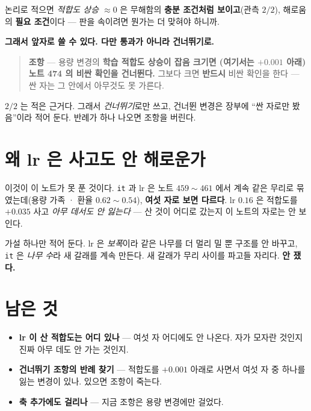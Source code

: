 \documentclass[11pt]{article}
\begin{document}
논리로 적으면 \emph{적합도 상승 $\approx 0$} 은 무해함의 \textbf{충분
조건처럼 보이고}(관측 $2/2$), 해로움의 \textbf{필요 조건}이다 --- 판을
속이려면 뭔가는 더 맞혀야 하니까.

\textbf{그래서 앞자로 쓸 수 있다. 다만 통과가 아니라 건너뛰기로.}

\begin{quote}
\textbf{조항} --- 용량 변경의 \textbf{학습 적합도 상승이 잡음 크기면
(여기서는 $+0.001$ 아래) 노트 474 의 비싼 확인을 건너뛴다.} 그보다 크면
\textbf{반드시} 비싼 확인을 한다 --- 싼 자는 그 안에서 아무것도 못
가른다.
\end{quote}

$2/2$ 는 적은 근거다. 그래서 \emph{건너뛰기}로만 쓰고, 건너뛴 변경은
장부에 ``싼 자로만 봤음''이라 적어 둔다. 반례가 하나 나오면 조항을
버린다.

\section{왜 lr 은 사고도 안 해로운가}

이것이 이 노트가 못 푼 것이다. \texttt{it} 과 lr 은 노트 $459 \sim 461$
에서 계속 같은 무리로 묶였는데(용량 가족 · 환율 $0.62 \sim 0.54$),
\textbf{여섯 자로 보면 다르다}. lr $0.16$ 은 적합도를 $+0.035$ 사고
\emph{아무 데서도 안 잃는다} --- 산 것이 어디로 갔는지 이 노트의 자로는
안 보인다.

가설 하나만 적어 둔다. lr 은 \emph{보폭}이라 같은 나무를 더 멀리 밀 뿐
구조를 안 바꾸고, \texttt{it} 은 \emph{나무 수}라 새 갈래를 계속 만든다.
새 갈래가 무리 사이를 파고들 자리다. \textbf{안 쟀다.}

\section*{남은 것}

\begin{itemize}
\item \textbf{lr 이 산 적합도는 어디 있나} --- 여섯 자 어디에도 안 나온다.
자가 모자란 것인지 진짜 아무 데도 안 가는 것인지.
\item \textbf{건너뛰기 조항의 반례 찾기} --- 적합도를 $+0.001$ 아래로
사면서 여섯 자 중 하나를 잃는 변경이 있나. 있으면 조항이 죽는다.
\item \textbf{축 추가에도 걸리나} --- 지금 조항은 용량 변경에만 걸었다.
\end{itemize}
\end{document}
